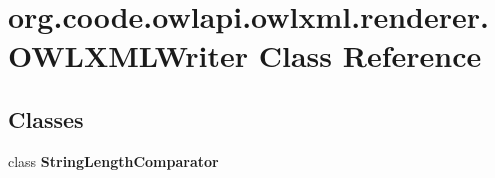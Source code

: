 \hypertarget{classorg_1_1coode_1_1owlapi_1_1owlxml_1_1renderer_1_1_o_w_l_x_m_l_writer}{\section{org.\-coode.\-owlapi.\-owlxml.\-renderer.\-O\-W\-L\-X\-M\-L\-Writer Class Reference}
\label{classorg_1_1coode_1_1owlapi_1_1owlxml_1_1renderer_1_1_o_w_l_x_m_l_writer}
}
\subsection*{Classes}
\begin{DoxyCompactItemize}
\item 
class {\bfseries String\-Length\-Comparator}
\end{DoxyCompactItemize}
